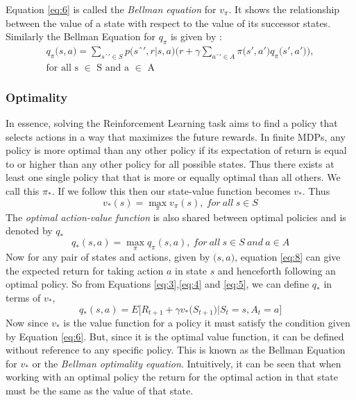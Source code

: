 \documentclass[12pt]{extarticle}
\numberwithin{equation}{section}
\begin{document}
	Equation \ref{eq:6} is called the \textit{Bellman equation} for $v_{\pi}$. It shows the relationship between the value of a state with respect to the value of its successor states. Similarly the Bellman Equation for $q_{\pi}$ is given by :
	\begin{align}
	q_{\pi}\big(s,a\big) = \sum_{sˆ' \in S}{p\big(sˆ',r|s,a\big)}\bigg(r + \gamma\sum_{aˆ'\in A}\pi\big(s',a'\big)q_{\pi}\big(s',a'\big)\bigg),\\
	\text{for all s $\in$ S and a $\in$ A}\nonumber
	\end{align}
	\subsubsection{Optimality} \label{optimality}
	In essence, solving the Reinforcement Learning task aims to find a policy that selects actions in a way that maximizes the future rewards\cite{Sutton-introRL}. In finite MDPs, any policy is more optimal than any other policy if its expectation of return is equal to or higher than any other policy for all possible states. Thus there
	exists at least one single policy that that is more or equally optimal than all others\cite{Sutton-introRL}. We call this $\pi_*$. If we follow this then our state-value function becomes $v_*$. Thus
	\begin{equation}
	v_*(s) = \max_{\pi} v_{\pi}(s),\ for \ all \ s \in S \label{eq:7}
	\end{equation}
	The \textit{optimal action-value function} is also shared between optimal policies and is denoted by $q_*$
	\begin{equation}
	q_*(s,a) = \max_{\pi} q_{\pi}(s,a),\ for \ all \ s \in S \ and \ a \in A \label{eq:8}
	\end{equation}
	Now for any pair of states and actions, given by $\big(s,a\big)$, equation \ref{eq:8} can give the expected return for taking action $a$ in state $s$ and henceforth following an optimal policy. So from Equations \ref{eq:3},\ref{eq:4} and \ref{eq:5}, we can define $q_*$ in terms of $v_*$,
	\begin{equation}
	q_*(s,a) = E\big[R_{t+1} + \gamma v_* \big(S_{t+1}\big)| S_t = s,A_t = a ] \label{eq:9}
	\end{equation}
	Now since $v_*$ is the value function for a policy it must satisfy the condition given by Equation \ref{eq:6}. But, since it is the optimal value function, it can be defined without reference to any specific policy. This is known as the Bellman Equation for $v_*$ or the \textit{Bellman optimality equation}. Intuitively, it can be seen that when working with an optimal policy the return for the optimal action in that state must be the same as the value of that state.\cite{Sutton-introRL}
\end{document}
